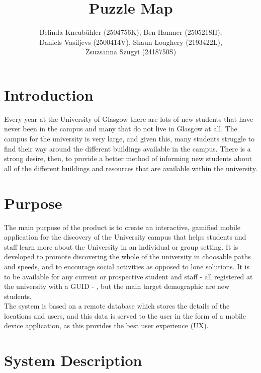 \documentclass[10pt,twocolumn]{article} %
\author{
  Belinda Kneubühler (2504756K), Ben Hanmer (2505218H),\\
  Daniels Vasiljevs (2500414V), Shaun Loughery (2193422L),\\
  Zsuzsanna Szugyi (2418750S)}
\title{Puzzle Map}
\date{} %
\begin{document}
\maketitle


\section*{Introduction}

Every year at the University of Glasgow there are lots of new students that have never been in the campus and many that do not live in Glasgow at all. The campus for the university is very large, and given this, many students struggle to find their way around the different buildings available in the campus. There is a strong desire, then, to provide a better method of informing new students about all of the different buildings and resources that are available within the university.

\section*{Purpose}

The main purpose of the product is to create an interactive, gamified mobile application for the discovery of the University campus that helps students and staff learn more about the University in an individual or group setting. It is developed to promote discovering the whole of the university in choosable paths and speeds,  and to encourage social activities as opposed to lone solutions. It is to be available for any current or prospective student and staff - all registered at the university with a GUID - , but the main target demographic are new students.\\
The system is based on a remote database which stores the details of the locations and users, and this data is served to the user in the form of a mobile device application, as this provides the best user experience (UX).

\section*{System Description}
\end{document}
